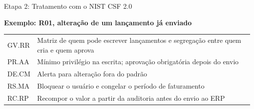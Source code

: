 \documentclass{beamer}
\begin{document}
\begin{frame}{Etapa 2: Tratamento com o NIST CSF 2.0}
    \centering

    \vspace{0.2cm}
    \raggedright
    \small
    \textbf{Exemplo: R01, alteração de um lançamento já enviado}

    \vspace{0.05cm}
    \scriptsize
    \renewcommand{\arraystretch}{1.2}
    \begin{tabular}{@{}l p{8.6cm}@{}}
        \toprule
        GV.RR & Matriz de quem pode escrever lançamentos e segregação entre quem cria e quem aprova \\
        PR.AA & Mínimo privilégio na escrita; aprovação obrigatória depois do envio \\
        DE.CM & Alerta para alteração fora do padrão \\
        RS.MA & Bloquear o usuário e congelar o período de faturamento \\
        RC.RP & Recompor o valor a partir da auditoria antes do envio ao ERP \\
        \bottomrule
    \end{tabular}


\end{frame}
\end{document}
